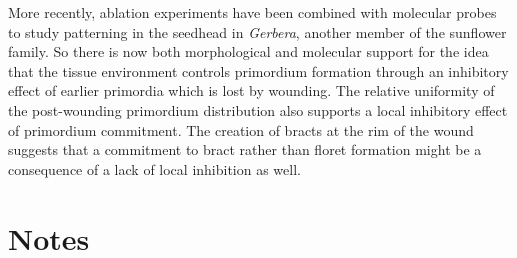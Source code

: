 More recently, ablation experiments have been combined with molecular probes to study patterning in the seedhead in \textit{Gerbera}, another member of the sunflower family.
So there is now both morphological and molecular support for the idea that the tissue environment controls  primordium formation through an inhibitory  effect of earlier primordia which is  lost by wounding.  The relative uniformity of the post-wounding primordium distribution also supports a local inhibitory effect of primordium commitment. The creation of bracts at the rim of the wound suggests that a commitment to bract rather than floret formation might be a consequence of a lack of local inhibition as well. 

  
\section{Notes}
